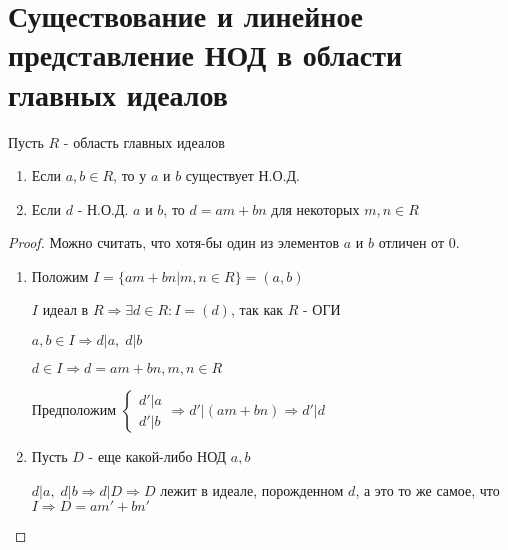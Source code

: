 
\section{Существование и линейное представление НОД в области главных идеалов}
\begin{normalsize}
\begin{theorem-non}
    Пусть $R$ - область главных идеалов 

    \begin{enumerate}
        \item Если $a, b \in R$, то у $a$ и $b$ существует Н.О.Д.
        \item Если $d$ - Н.О.Д. $a$ и $b$, то $d = am + bn$ для некоторых $m, n \in R$
    \end{enumerate}
    \begin{proof}
        Можно считать, что хотя-бы один из элементов $a$ и $b$ отличен от $0$.
        \begin{enumerate}
            \item Положим $I = \{am + bn | m, n \in R\} = (a, b)$ 
            
            
            $I$ идеал в $R \Longrightarrow \exists d \in R : I = (d)$, так как $R$ - ОГИ  

            $a, b \in I \Longrightarrow d | a, \; d | b$

            $d \in I \Longrightarrow d = am + bn, m,n \in R$

            Предположим $\begin{cases}
                d' | a \\
                d' | b
            \end{cases} \Longrightarrow d' | (am + bn) \Longrightarrow d' | d$

            \item Пусть $D$ - еще какой-либо НОД $a, b$ 

            $d | a, \; d|b \Longrightarrow d | D \Longrightarrow D$ лежит в идеале, порожденном $d$, а это то же самое, что $I \Longrightarrow D = am' + bn'$ 
        \end{enumerate}
    \end{proof}
\end{theorem-non}
\end{normalsize}